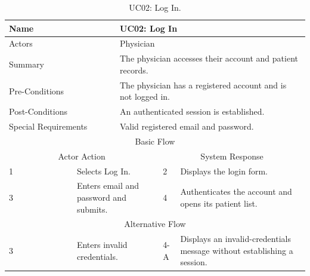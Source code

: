 \begin{table}[htbp]
\centering
\small
\caption{UC02: Log In.}
\label{tab:kashaf:uc02}
\begin{tabular}{|p{}|p{}|p{}|p{}|p{}|}
\hline
\multicolumn{2}{|p{\dimexpr0.225\textwidth+2\tabcolsep+\arrayrulewidth\relax}|}{Name} & \multicolumn{3}{p{\dimexpr0.575\textwidth+4\tabcolsep+2\arrayrulewidth\relax}|}{UC02: Log In} \\ \hline
\multicolumn{2}{|p{\dimexpr0.225\textwidth+2\tabcolsep+\arrayrulewidth\relax}|}{Actors} & \multicolumn{3}{p{\dimexpr0.575\textwidth+4\tabcolsep+2\arrayrulewidth\relax}|}{Physician} \\ \hline
\multicolumn{2}{|p{\dimexpr0.225\textwidth+2\tabcolsep+\arrayrulewidth\relax}|}{Summary} & \multicolumn{3}{p{\dimexpr0.575\textwidth+4\tabcolsep+2\arrayrulewidth\relax}|}{The physician accesses their account and patient records.} \\ \hline
\multicolumn{2}{|p{\dimexpr0.225\textwidth+2\tabcolsep+\arrayrulewidth\relax}|}{Pre-Conditions} & \multicolumn{3}{p{\dimexpr0.575\textwidth+4\tabcolsep+2\arrayrulewidth\relax}|}{The physician has a registered account and is not logged in.} \\ \hline
\multicolumn{2}{|p{\dimexpr0.225\textwidth+2\tabcolsep+\arrayrulewidth\relax}|}{Post-Conditions} & \multicolumn{3}{p{\dimexpr0.575\textwidth+4\tabcolsep+2\arrayrulewidth\relax}|}{An authenticated session is established.} \\ \hline
\multicolumn{2}{|p{\dimexpr0.225\textwidth+2\tabcolsep+\arrayrulewidth\relax}|}{Special Requirements} & \multicolumn{3}{p{\dimexpr0.575\textwidth+4\tabcolsep+2\arrayrulewidth\relax}|}{Valid registered email and password.} \\ \hline
\multicolumn{5}{|c|}{Basic Flow} \\ \hline
\multicolumn{3}{|c|}{Actor Action} & \multicolumn{2}{c|}{System Response} \\ \hline
1 & \multicolumn{2}{p{\dimexpr0.37\textwidth+2\tabcolsep+\arrayrulewidth\relax}|}{Selects Log In.} & 2 & Displays the login form. \\ \hline
3 & \multicolumn{2}{p{\dimexpr0.37\textwidth+2\tabcolsep+\arrayrulewidth\relax}|}{Enters email and password and submits.} & 4 & Authenticates the account and opens its patient list. \\ \hline
\multicolumn{5}{|c|}{Alternative Flow} \\ \hline
3 & \multicolumn{2}{p{\dimexpr0.37\textwidth+2\tabcolsep+\arrayrulewidth\relax}|}{Enters invalid credentials.} & 4-A & Displays an invalid-credentials message without establishing a session. \\ \hline
\end{tabular}
\end{table}

